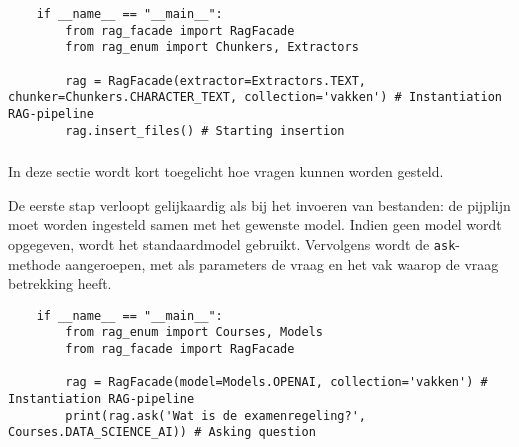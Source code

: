 \begin{verbatim}
    if __name__ == "__main__":
        from rag_facade import RagFacade
        from rag_enum import Chunkers, Extractors
        
        rag = RagFacade(extractor=Extractors.TEXT, chunker=Chunkers.CHARACTER_TEXT, collection='vakken') # Instantiation RAG-pipeline 
        rag.insert_files() # Starting insertion
\end{verbatim}

\subsubsection{}%
\label{subsubsec:asking}

In deze sectie wordt kort toegelicht hoe vragen kunnen worden gesteld.

De eerste stap verloopt gelijkaardig als bij het invoeren van bestanden: de pijplijn moet worden ingesteld samen met het gewenste model. Indien geen model wordt opgegeven, wordt het standaardmodel gebruikt. Vervolgens wordt de \texttt{ask}-methode aangeroepen, met als parameters de vraag en het vak waarop de vraag betrekking heeft.

\begin{verbatim}
    if __name__ == "__main__":
        from rag_enum import Courses, Models
        from rag_facade import RagFacade
    
        rag = RagFacade(model=Models.OPENAI, collection='vakken') # Instantiation RAG-pipeline 
        print(rag.ask('Wat is de examenregeling?', Courses.DATA_SCIENCE_AI)) # Asking question
\end{verbatim}
